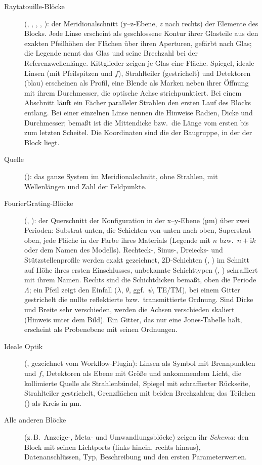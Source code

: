 \begin{description}
  \item[Raytatouille-Blöcke] (, , ,
        , ): der Meridionalschnitt (y–z-Ebene, $z$ nach
        rechts) der Elemente des Blocks. Jede Linse erscheint als geschlossene Kontur ihrer
        Glasteile aus den exakten Pfeilhöhen der Flächen über ihren Aperturen, gefärbt nach Glas;
        die Legende nennt das Glas und seine Brechzahl bei der Referenzwellenlänge. Kittglieder
        zeigen je Glas eine Fläche. Spiegel, ideale Linsen (mit Pfeilspitzen und $f$), Strahlteiler
        (gestrichelt) und Detektoren (blau) erscheinen als Profil, eine Blende als Marken neben
        ihrer Öffnung mit ihrem Durchmesser, die optische Achse strichpunktiert. Bei einem
        Abschnitt läuft ein Fächer paralleler Strahlen den ersten Lauf des Blocks entlang. Bei
        einer einzelnen Linse nennen die Hinweise Radien, Dicke und Durchmesser; bemaßt ist die
        Mittendicke bzw.\ die Länge vom ersten bis zum letzten Scheitel. Die Koordinaten sind die
        der Baugruppe, in der der Block liegt.
  \item[Quelle] (): das ganze System im Meridionalschnitt, ohne Strahlen, mit
        Wellenlängen und Zahl der Feldpunkte.
  \item[FourierGrating-Blöcke] (, ): der Querschnitt der
        Konfiguration in der x–y-Ebene (µm) über zwei Perioden: Substrat unten, die Schichten von
        unten nach oben, Superstrat oben, jede Fläche in der Farbe ihres Materials (Legende mit
        $n$ bzw.\ $n + \mathrm{i}k$ oder dem Namen des Modells). Rechteck-, Sinus-, Dreiecks- und
        Stützstellenprofile werden exakt gezeichnet, 2D-Schichten (,
        ) im Schnitt auf Höhe ihres ersten Einschlusses, unbekannte Schichttypen
        (, ) schraffiert mit ihrem Namen. Rechts sind die Schichtdicken
        bemaßt, oben die Periode $\Lambda$; ein Pfeil zeigt den Einfall ($\lambda$, $\theta$, ggf.\
        $\psi$, TE/TM), bei einem Gitter gestrichelt die nullte reflektierte bzw.\ transmittierte
        Ordnung. Sind Dicke und Breite sehr verschieden, werden die Achsen verschieden skaliert
        (Hinweis unter dem Bild). Ein Gitter, das nur eine Jones-Tabelle hält, erscheint als
        Probenebene mit seinen Ordnungen.
  \item[Ideale Optik] (, gezeichnet vom Workflow-Plugin): Linsen als Symbol mit
        Brennpunkten und $f$, Detektoren als Ebene mit Größe und ankommendem Licht, die
        kollimierte Quelle als Strahlenbündel, Spiegel mit schraffierter Rückseite, Strahlteiler
        gestrichelt, Grenzflächen mit beiden Brechzahlen; das Teilchen
        (\block{fusion.particle}) als Kreis in µm.
  \item[Alle anderen Blöcke] (z.\,B.\ Anzeige-, Meta- und Umwandlungsblöcke) zeigen ihr
        \emph{Schema}: den Block mit seinen Lichtports (links hinein, rechts hinaus),
        Datenanschlüssen, Typ, Beschreibung und den ersten Parameterwerten.
\end{description}


